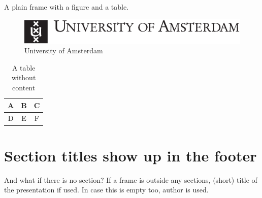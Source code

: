 \documentclass[pdf]{beamer}
\begin{document}
\begin{frame}[plain]

	A plain frame with a figure and a table.

	\vfill

	\begin{figure}
		\caption{University of Amsterdam}\label{fig:uva-logo}
		\includegraphics{beamerthemeUniversityOfAmsterdam/logo/uva_logo_ENG.pdf}
	\end{figure}
	
	\begin{table}
		\begin{tabular}{|c|c|c|}
			\hline
			A & B & C \\
			\hline
			D & E & F \\
			\hline
		\end{tabular}
		\caption{A table without content}\label{tab:nonsense}
	\end{table}
\end{frame}

\section{Section titles show up in the footer}

\begin{frame}{\insertsectionhead}
	\begin{alertblock}{And what if there is no section?}
		If a frame is outside any sections, (short) title of the presentation if used. In case this is empty too, author is used.
	\end{alertblock}
\end{frame}
\end{document}
